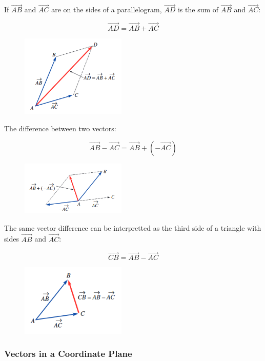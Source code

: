 \documentclass{article}
\begin{document}
If \(\overrightarrow{AB}\) and \(\overrightarrow{AC}\) are on the sides of a parallelogram, \(\overrightarrow{AD}\) is the sum of \(\overrightarrow{AB}\) and \(\overrightarrow{AC}\): 

\[\overrightarrow{AD} = \overrightarrow{AB} + \overrightarrow{AC}\]

\begin{figure}[h]
  \includegraphics[width=5cm]{images/figure2.PNG}
  \centering
\end{figure}

The difference between two vectors:

\[\overrightarrow{AB} - \overrightarrow{AC} = \overrightarrow{AB} + (-\overrightarrow{AC})\]

\begin{figure}[h]
  \includegraphics[width=5cm]{images/figure3.PNG}
  \centering
\end{figure}

The same vector difference can be interpretted as the third side of a triangle with sides \(\overrightarrow{AB}\) and \(\overrightarrow{AC}\):

\[\overrightarrow{CB} = \overrightarrow{AB} - \overrightarrow{AC}\]

\begin{figure}[h]
  \includegraphics[width=5cm]{images/figure4.PNG}
  \centering
\end{figure}

\subsubsection{Vectors in a Coordinate Plane}
\end{document}
